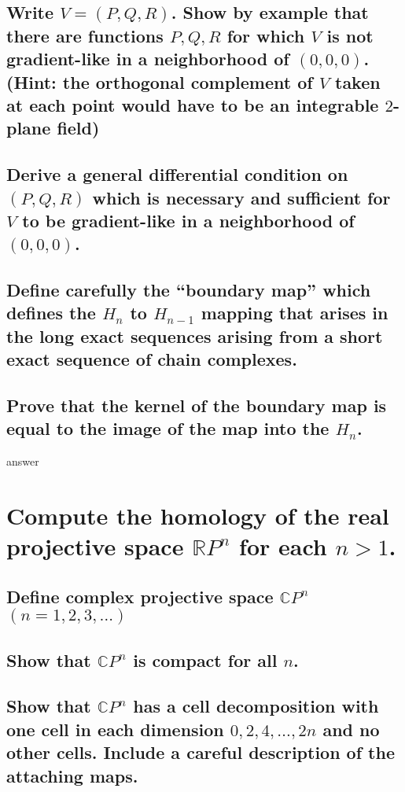\documentclass[10pt]{article}
\newcommand{\advsection}{\addtocounter{section}{1} \setcounter{subsection}{0}}
\newcommand{\hint}[1]{(Hint: #1)}
\begin{document}
\subsection{Write $V = (P,Q,R)$. Show by example that there are functions $P,Q,R$ for which $V$ is
  not gradient-like in a neighborhood of $(0,0,0)$. \hint{the orthogonal complement of $V$ taken at
    each point would have to be an integrable $2$-plane field}}

\subsection{Derive a general differential condition on $(P,Q,R)$ which is necessary and sufficient
  for $V$ to be gradient-like in a neighborhood of $(0,0,0)$.}

\advsection{}

\subsection{Define carefully the ``boundary map'' which defines the $H_n$ to $H_{n-1}$ mapping that
  arises in the long exact sequences arising from a short exact sequence of chain complexes.}

\subsection{Prove that the kernel of the boundary map is equal to the image of the map into the $H_n$.}

answer

\section{Compute the homology of the real projective space $\mathbb{R} P^n$ for each $n > 1$.}

\advsection{}

\subsection{Define complex projective space $\mathbb{C} P^n$ $(n = 1,2,3, \dots)$}

\subsection{Show that $\mathbb{C} P^n$ is compact for all $n$.}

\subsection{Show that $\mathbb{C} P^n$ has a cell decomposition with one cell in each dimension
  $0,2,4,\dots, 2n$ and no other cells. Include a careful description of the attaching maps.}
\end{document}
